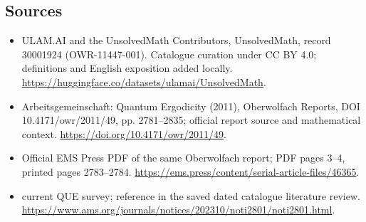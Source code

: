 \documentclass[11pt]{article}
\begin{document}
\subsection{Sources}
\begin{itemize}
\item[\hypertarget{source:30001924:1}{S1}] ULAM.AI and the UnsolvedMath Contributors, UnsolvedMath, record 30001924 (OWR-11447-001). Catalogue curation under CC BY 4.0; definitions and English exposition added locally.
\url{https://huggingface.co/datasets/ulamai/UnsolvedMath}.
\item[\hypertarget{source:30001924:2}{S2}] Arbeitsgemeinschaft: Quantum Ergodicity (2011), Oberwolfach Reports, DOI 10.4171/owr/2011/49, pp. 2781--2835; official report source and mathematical context.
\url{https://doi.org/10.4171/owr/2011/49}.
\item[\hypertarget{source:30001924:3}{S3}] Official EMS Press PDF of the same Oberwolfach report; PDF pages 3--4, printed pages 2783--2784.
\url{https://ems.press/content/serial-article-files/46365}.
\item[\hypertarget{source:30001924:4}{S4}] current QUE survey; reference in the saved dated catalogue literature review.
\url{https://www.ams.org/journals/notices/202310/noti2801/noti2801.html}.
\end{itemize}
\label{end:30001924}
\end{document}
